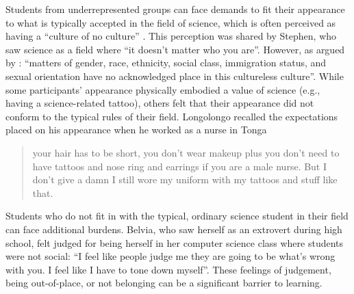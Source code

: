 Students from underrepresented groups can face demands to fit their appearance to what is typically accepted in the field of science, which is often perceived as having a ``culture of no culture'' \citep{traweek2009beamtimes}. This perception was shared by Stephen, who saw science as a field where ``it doesn't matter who you are''. However, as argued by \cite{ong2005body}: ``matters of gender, race, ethnicity, social class, immigration status, and sexual orientation have no acknowledged place in this cultureless culture''. While some participants' appearance physically embodied a value of science (e.g., having a science-related tattoo), others felt that their appearance did not conform to the typical rules of their field.  Longolongo recalled the expectations placed on his appearance when he worked as a nurse in Tonga \blockquote{your hair has to be short, you don't wear makeup plus you don't need to have tattoos and nose ring and earrings if you are a male nurse. But I don’t give a damn I still wore my uniform with my tattoos and stuff like that.} Students who do not fit in with the typical, ordinary science student in their field can face additional burdens. Belvia, who saw herself as an extrovert during high school, felt judged for being herself in her computer science class where students were not social: ``I feel like people judge me they are going to be what’s wrong with you. I feel like I have to tone down myself''. These feelings of judgement, being out-of-place, or not belonging can be a significant barrier to learning. 

